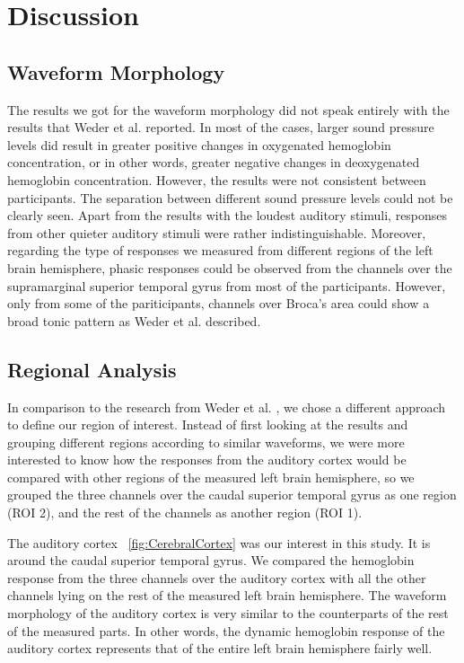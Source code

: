 \chapter{Discussion}

\section{Waveform Morphology}
The results we got for the waveform morphology did not speak entirely with the results that Weder et al. \citeyearpar{Weder2018} reported. In most of the cases, larger sound pressure levels did result in greater positive changes in oxygenated hemoglobin concentration, or in other words, greater negative changes in deoxygenated hemoglobin concentration. However, the results were not consistent between participants. The separation between different sound pressure levels could not be clearly seen. Apart from the results with the loudest auditory stimuli, responses from other quieter auditory stimuli were rather indistinguishable. Moreover, regarding the type of responses we measured from different regions of the left brain hemisphere, phasic responses could be observed from the channels over the supramarginal superior temporal gyrus from most of the participants. However, only from some of the pariticipants, channels over Broca's area could show a broad tonic pattern as Weder et al. \citeyearpar{Weder2018} described.

\section {Regional Analysis}
In comparison to the research from Weder et al. \citeyearpar{Weder2018}, we chose a different approach to define our region of interest. Instead of first looking at the results and grouping different regions according to similar waveforms, we were more interested to know how the responses from the auditory cortex would be compared with other regions of the measured left brain hemisphere, so we grouped the three channels over the caudal superior temporal gyrus as one region (ROI 2), and the rest of the channels as another region (ROI 1).

The auditory cortex ~\ref{fig:CerebralCortex} was our interest in this study. It is around the caudal superior temporal gyrus. We compared the hemoglobin response from the three channels over the auditory cortex with all the other channels lying on the rest of the measured left brain hemisphere. The waveform morphology of the auditory cortex is very similar to the counterparts of the rest of the measured parts. In other words, the dynamic hemoglobin response of the auditory cortex represents that of the entire left brain hemisphere fairly well.


